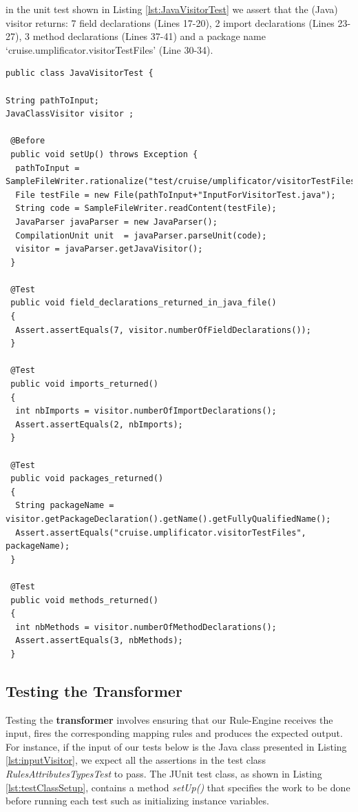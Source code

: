 in the unit test shown in Listing \ref{lst:JavaVisitorTest} we assert that the (Java) visitor returns: 7 field declarations (Lines 17-20), 2 import declarations (Lines 23-27), 3 method declarations (Lines 37-41) and a package name `cruise.umplificator.visitorTestFiles' (Line 30-34).


\begin{lstlisting}[style=java,label={lst:JavaVisitorTest}, caption=A JavaVisitorTest.java]
public class JavaVisitorTest {

String pathToInput;
JavaClassVisitor visitor ;
	
 @Before
 public void setUp() throws Exception {
  pathToInput = SampleFileWriter.rationalize("test/cruise/umplificator/visitorTestFiles/");
  File testFile = new File(pathToInput+"InputForVisitorTest.java");
  String code = SampleFileWriter.readContent(testFile);
  JavaParser javaParser = new JavaParser();
  CompilationUnit unit  = javaParser.parseUnit(code);
  visitor = javaParser.getJavaVisitor();
 }
	
 @Test
 public void field_declarations_returned_in_java_file()
 {
  Assert.assertEquals(7, visitor.numberOfFieldDeclarations());
 }
		
 @Test
 public void imports_returned()
 {
  int nbImports = visitor.numberOfImportDeclarations();
  Assert.assertEquals(2, nbImports);
 }
	
 @Test
 public void packages_returned()
 {
  String packageName = visitor.getPackageDeclaration().getName().getFullyQualifiedName();
  Assert.assertEquals("cruise.umplificator.visitorTestFiles", packageName);
 }

 @Test
 public void methods_returned()
 {
  int nbMethods = visitor.numberOfMethodDeclarations();
  Assert.assertEquals(3, nbMethods);
 }
\end{lstlisting}

\subsection{Testing the Transformer}

Testing the \textbf{transformer} involves ensuring that our Rule-Engine receives the input, fires the corresponding mapping rules and produces the expected output.
For instance, if the input of our tests below is the Java class presented in Listing \ref{lst:inputVisitor}, we expect all the assertions in the test class \textit{RulesAttributesTypesTest} to pass. The JUnit test class, as shown in Listing \ref{lst:testClassSetup}, contains a  method \textit{setUp()} that specifies the work to be done before running each test such as initializing instance variables. 

